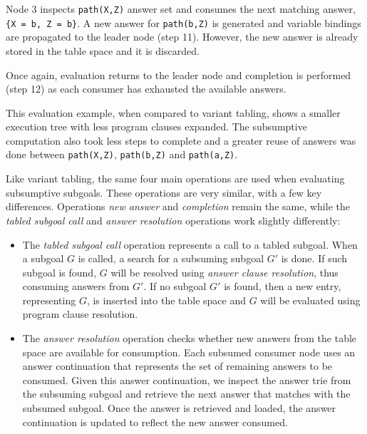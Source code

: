 Node 3 inspects \texttt{path(X,Z)} answer set and consumes the next matching answer, \texttt{\{X~=~b,~Z~=~b\}}.
A new answer for \texttt{path(b,Z)} is generated and variable bindings are propagated to the leader node (step 11).
However, the new answer is already stored in the table space and it is discarded.

Once again, evaluation returns to the leader node and completion is performed (step 12) as each consumer has exhausted the
available answers.

This evaluation example, when compared to variant tabling, shows a smaller execution tree with less
program clauses expanded. The subsumptive computation also took less steps to complete and a greater
reuse of answers was done between \texttt{path(X,Z)}, \texttt{path(b,Z)} and \texttt{path(a,Z)}.

Like variant tabling, the same four main operations are used when evaluating subsumptive subgoals.
These operations are very similar, with a few key differences. Operations \textit{new answer} and
\textit{completion} remain the same, while the \textit{tabled subgoal call} and \textit{answer resolution}
operations work slightly differently:

\begin{itemize}
\item The \textit{tabled subgoal call} operation represents a call to a tabled subgoal.
When a subgoal $G$ is called, a search for a subsuming subgoal $G'$ is done. If such subgoal is found,
$G$ will be resolved using \textit{answer clause resolution}, thus consuming answers from $G'$.
If no subgoal $G'$ is found, then a new entry, representing $G$, is inserted into the table space and
$G$ will be evaluated using program clause resolution.

\item The \textit{answer resolution} operation checks whether new answers from the table space are
available for consumption. Each subsumed consumer node uses an answer continuation that represents
the set of remaining answers to be consumed. Given this answer continuation, we inspect the answer trie
from the subsuming subgoal and retrieve the next answer that matches with the subsumed subgoal. Once the
answer is retrieved and loaded, the answer continuation is updated to reflect the new answer consumed.

\end{itemize}


